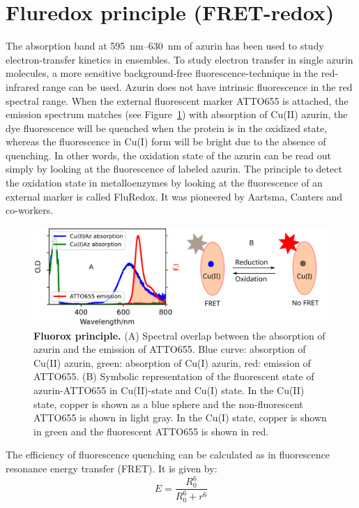 \section{Fluredox principle (FRET-redox)}
The absorption band at \SIrange{595}{630}{\nm} of azurin has been used to study electron-transfer kinetics in ensembles.
To study electron transfer in single azurin molecules, a more sensitive background-free fluorescence-technique in the red-infrared range can be used.
Azurin does not have intrinsic fluorescence in the red spectral range.
When the external fluorescent marker ATTO655 is attached, the emission spectrum matches (see Figure~\ref{fig:flurox_azurin}) with absorption of Cu(II) azurin, the dye fluorescence will be quenched when the protein is in the oxidized state, whereas the fluorescence in Cu(I) form will be bright due to the absence of quenching.
In other words, the oxidation state of the azurin can be read out simply by looking at the fluorescence of labeled azurin.
The principle to detect the oxidation state in metalloenzymes by looking at the fluorescence of an external marker is called FluRedox. It was pioneered by Aartsma, Canters and co-workers.\cite{kuznetsova2008the,goldsmith2011redox,tabares2011fluorescence}
\begin{figure}
	\centering
	\includegraphics[width=\textwidth]{flurox_azurin}
	\caption{\textbf{Fluorox principle.} (A) Spectral overlap between the absorption of azurin and the emission of ATTO655. Blue curve: absorption of Cu(II) azurin, green: absorption of Cu(I) azurin, red: emission of ATTO655.
	(B) Symbolic representation of the fluorescent state of azurin-ATTO655 in Cu(II)-state and Cu(I) state. In the Cu(II) state, copper is shown as a blue sphere and the non-fluorescent ATTO655 is shown in light gray. In the Cu(I) state, copper is shown in green and the fluorescent ATTO655 is shown in red.}
	\label{fig:flurox_azurin}
\end{figure}
The efficiency of fluorescence quenching can be calculated as in fluorescence resonance energy transfer (FRET). It is given by:
\begin{equation}
	E = \frac{R_0^6}{R_0^6 + r^6}	
\end{equation}
